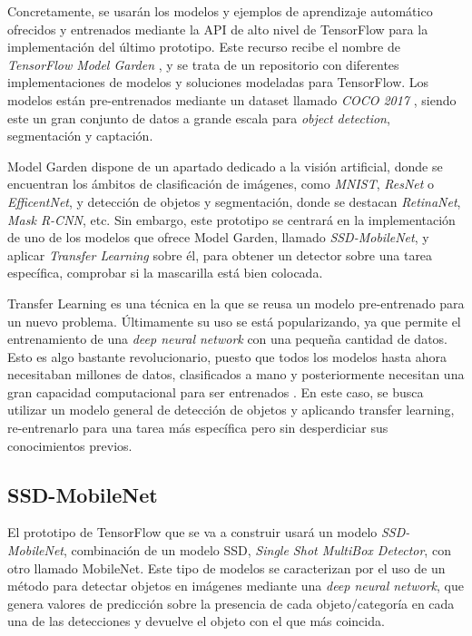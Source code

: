 Concretamente, se usarán los modelos y ejemplos de aprendizaje automático ofrecidos y entrenados mediante la API de alto nivel de TensorFlow para la implementación del último prototipo. Este recurso recibe el nombre de \textit{TensorFlow Model Garden} \cite{modelGarden}, y se trata de un repositorio con diferentes implementaciones de modelos y soluciones modeladas para TensorFlow. Los modelos están pre-entrenados mediante un dataset llamado \textit{COCO 2017} \cite{coco}, siendo este un gran conjunto de datos a grande escala para \textit{object detection}, segmentación y captación.

Model Garden dispone de un apartado dedicado a la visión artificial, donde se encuentran los ámbitos de clasificación de imágenes, como \textit{MNIST}, \textit{ResNet} o \textit{EfficentNet}, y detección de objetos y segmentación, donde se destacan \textit{RetinaNet}, \textit{Mask R-CNN}, etc. Sin embargo, este prototipo se centrará en la implementación de uno de los modelos que ofrece Model Garden, llamado \textit{SSD-MobileNet}, y aplicar \textit{Transfer Learning} sobre él, para obtener un detector sobre una tarea específica, comprobar si la mascarilla está bien colocada.

Transfer Learning es una técnica en la que se reusa un modelo pre-entrenado para un nuevo problema. Últimamente su uso se está popularizando, ya que permite el entrenamiento de una \textit{deep neural network} con una pequeña cantidad de datos. Esto es algo bastante revolucionario, puesto que todos los modelos hasta ahora necesitaban millones de datos, clasificados a mano y posteriormente necesitan una gran capacidad computacional para ser entrenados \cite{transferLearning}. En este caso, se busca utilizar un modelo general de detección de objetos y aplicando transfer learning, re-entrenarlo para una tarea más específica pero sin desperdiciar sus conocimientos previos.

\subsection*{SSD-MobileNet}

El prototipo de TensorFlow que se va a construir usará un modelo \textit{SSD-MobileNet}, combinación de un modelo SSD, \textit{Single Shot MultiBox Detector}, con otro llamado MobileNet. Este tipo de modelos se caracterizan por el uso de un método para detectar objetos en imágenes mediante una \textit{deep neural network}, que genera valores de predicción sobre la presencia de cada objeto/categoría en cada una de las detecciones y devuelve el objeto con el que más coincida.

